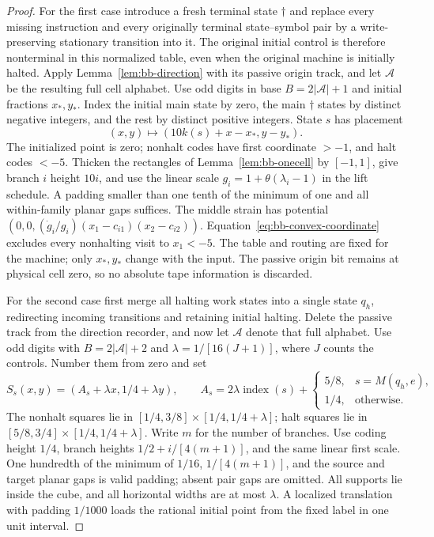\begin{proof}\label{proof:bb-aligned38}\label{proof:bb-direction39}
For the first case introduce a fresh terminal state $\dagger$ and
replace every missing instruction and every originally terminal
state--symbol pair by a write-preserving stationary transition into it.
The original initial control is therefore nonterminal in this normalized
table, even when the original machine is initially halted. Apply
Lemma~\ref{lem:bb-direction} with its passive origin track, and let
$\mathcal A$ be the resulting full cell alphabet. Use odd digits in
base $B=2|\mathcal A|+1$
and initial fractions $x_*,y_*$.  Index the initial main state by zero,
the main $\dagger$ states by distinct negative integers, and the rest
by distinct positive integers.  State $s$ has placement
\[
 (x,y)\longmapsto(10k(s)+x-x_*,y-y_*).
\]
The initialized point is zero; nonhalt codes have first coordinate
$>-1$, and halt codes $<-5$.  Thicken the rectangles of
Lemma~\ref{lem:bb-onecell} by $[-1,1]$, give branch $i$ height $10i$,
and use the linear scale $g_i=1+\theta(\lambda_i-1)$ in the lift
schedule.  A padding smaller than one tenth of the minimum of one
and all within-family planar gaps suffices.  The middle strain has
potential $(0,0,(\dot g_i/g_i)(x_1-c_{i1})(x_2-c_{i2}))$.
Equation~\eqref{eq:bb-convex-coordinate} excludes every nonhalting
visit to $x_1<-5$.  The table and routing are fixed for the machine;
only $x_*,y_*$ change with the input.  The passive origin bit remains
at physical cell zero, so no absolute tape information is discarded.

For the second case first merge all halting work states into a single
state $q_h$, redirecting incoming transitions and retaining initial halting.
Delete the passive track from the direction recorder, and now let
$\mathcal A$ denote that full alphabet. Use odd digits with
$B=2|\mathcal A|+2$ and
$\lambda=1/[16(J+1)]$, where $J$ counts the controls.  Number them
from zero and set
\[
 S_s(x,y)=(A_s+\lambda x,1/4+\lambda y),\qquad
 A_s=2\lambda\operatorname{index}(s)+
 \begin{cases}5/8,&s=M(q_h,e),\\1/4,&\text{otherwise}.
 \end{cases}
\]
The nonhalt squares lie in $[1/4,3/8]\times[1/4,1/4+\lambda]$;
halt squares lie in $[5/8,3/4]\times[1/4,1/4+\lambda]$.
Write $m$ for the number of branches. Use coding height $1/4$,
branch heights $1/2+i/[4(m+1)]$, and
the same linear first scale.  One hundredth of the minimum of
$1/16$, $1/[4(m+1)]$, and the source and target planar gaps is
valid padding; absent pair gaps are omitted.  All supports lie inside
the cube, and all horizontal widths are at most $\lambda$.
A localized translation with padding $1/1000$ loads the rational
initial point from the fixed label in one unit interval.


\end{proof}
